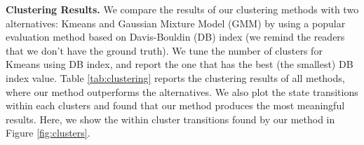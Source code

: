%
{\bf Clustering Results.} We compare the results of our clustering methods with two alternatives: Kmeans and Gaussian Mixture Model (GMM) by using a popular evaluation method based on Davis-Bouldin (DB) index \cite{dbindex} (we remind the readers that we don't have the ground truth). 
We tune the number of clusters for Kmeans using DB index, and report the one that has the best (the smallest) DB index value. 
Table \ref{tab:clustering} reports the clustering results of all methods, 
where our method outperforms the alternatives. We also plot the state transitions within each clusters  
and found that our method produces the most meaningful results. Here, we show the within cluster transitions found by our
method in Figure \ref{fig:clusters}.  


